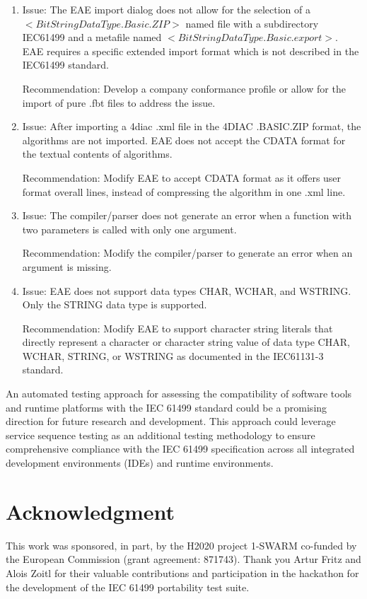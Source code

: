 \begin{bibunit}
\begin{enumerate}

\item Issue: The EAE import dialog does not allow for the selection of a $<BitStringDataType.Basic.ZIP>$ named file with a subdirectory IEC61499 and a metafile named $<BitStringDataType.Basic.export>$. EAE requires a specific extended import format which is not described in the IEC61499 standard.

Recommendation: Develop a company conformance profile or allow for the import of pure .fbt files to address the issue.

\item  Issue: After importing a 4diac .xml file in the 4DIAC .BASIC.ZIP format, the algorithms are not imported. EAE does not accept the CDATA format for the textual contents of algorithms.

Recommendation: Modify EAE to accept CDATA format as it offers user format overall lines, instead of compressing the algorithm in one .xml line.

\item Issue: The compiler/parser does not generate an error when a function with two parameters is called with only one argument.

Recommendation: Modify the compiler/parser to generate an error when an argument is missing.


\item Issue: EAE does not support data types CHAR, WCHAR, and WSTRING. Only the STRING data type is supported.

Recommendation: Modify EAE to support character string literals that directly represent a character or character string value of data type CHAR, WCHAR, STRING, or WSTRING as documented in the IEC61131-3 standard.
\end{enumerate}

An automated testing approach for assessing the compatibility of software tools and runtime platforms with the IEC 61499 standard could be a promising direction for future research and development. This approach could leverage service sequence testing as an additional testing methodology to ensure comprehensive compliance with the IEC 61499 specification across all integrated development environments (IDEs) and runtime environments. 

\section*{Acknowledgment}
This work was sponsored, in part, by the H2020 project 1-SWARM co-funded by the European Commission (grant agreement: 871743). Thank you Artur Fritz and Alois Zoitl for their valuable contributions and participation in the hackathon for the development of the IEC 61499 portability test suite.

\clearpage
\putbib
\end{bibunit} 